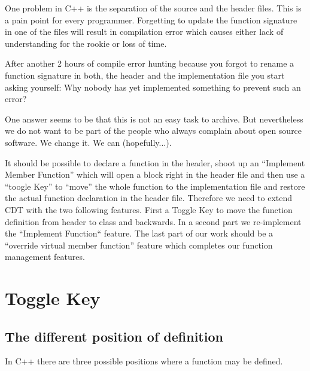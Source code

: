 \documentclass[a4paper,10pt,abstract=on]{scrreprt}
\begin{document}
One  problem in C++ is the separation of the source and the header files. This is a pain point for every programmer. Forgetting to update the function signature in one of the files will result in compilation error which causes either lack of understanding for the rookie or loss of time.

After another 2 hours of compile error hunting because you forgot to rename a function signature in both, the header and the implementation file you start asking yourself: Why nobody has yet implemented something to prevent such an error?

One answer seems to be that this is not an easy task to archive. But nevertheless we do not want to be part of the people who always complain about open source software. We change it. We can (hopefully...).

It should be possible to declare a function in the header, shoot up an ``Implement Member Function'' which will open a block right in the header file and then use a ``toogle Key'' to ``move'' the whole function to the implementation file and restore the actual function declaration in the header file. Therefore we need to extend CDT with the two following features. First a Toggle Key to move the function definition from header to class and backwards. In a second part we re-implement the ``Implement Function`` feature. The last part of our work should be a ``override virtual member function'' feature which completes our function management features.

\section{Toggle Key}
\subsection{The different position of definition}

In C++ there are three possible positions where a function may be defined.

%
%

%
%
\end{document}
